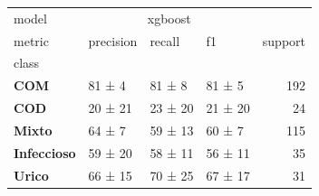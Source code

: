 \begin{tabular}{llllr}
\toprule
model & \multicolumn{3}{c}{xgboost} &  \\
metric & precision & recall & f1 & support \\
class &  &  &  &  \\
\midrule
\textbf{COM} & 81 ± 4 & 81 ± 8 & 81 ± 5 & 192 \\
\textbf{COD} & 20 ± 21 & 23 ± 20 & 21 ± 20 & 24 \\
\textbf{Mixto} & 64 ± 7 & 59 ± 13 & 60 ± 7 & 115 \\
\textbf{Infeccioso} & 59 ± 20 & 58 ± 11 & 56 ± 11 & 35 \\
\textbf{Urico} & 66 ± 15 & 70 ± 25 & 67 ± 17 & 31 \\
\bottomrule
\end{tabular}
